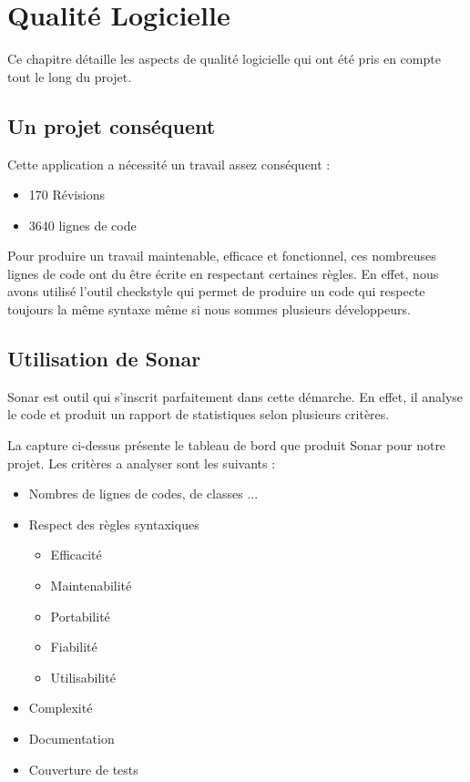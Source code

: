 \chapter{Qualité Logicielle}

Ce chapitre détaille les aspects de qualité logicielle qui ont été pris en compte tout le long du projet.

\section{Un projet conséquent}

Cette application a nécessité un travail assez conséquent :

\begin{itemize}
\item 170 Révisions
\item 3640 lignes de code
\end{itemize}

Pour produire un travail maintenable, efficace et fonctionnel, ces nombreuses lignes de code ont du être 
écrite en respectant certaines règles. En effet, nous avons utilisé l'outil checkstyle qui permet de produire un code qui respecte toujours la même syntaxe même si nous sommes plusieurs développeurs.

\section{Utilisation de Sonar}
Sonar est outil qui s'inscrit parfaitement dans cette démarche. En effet, il analyse le code et produit un rapport de statistiques selon plusieurs critères.



La capture ci-dessus présente le tableau de bord que produit Sonar pour notre projet. Les critères a analyser sont les suivants :

\begin{itemize}
\item Nombres de lignes de codes, de classes ...
\item Respect des règles syntaxiques
	\begin{itemize}
	\item Efficacité
	\item Maintenabilité
	\item Portabilité
	\item Fiabilité
	\item Utilisabilité
	\end{itemize}
\item Complexité
\item Documentation
\item Couverture de tests
\end{itemize}


